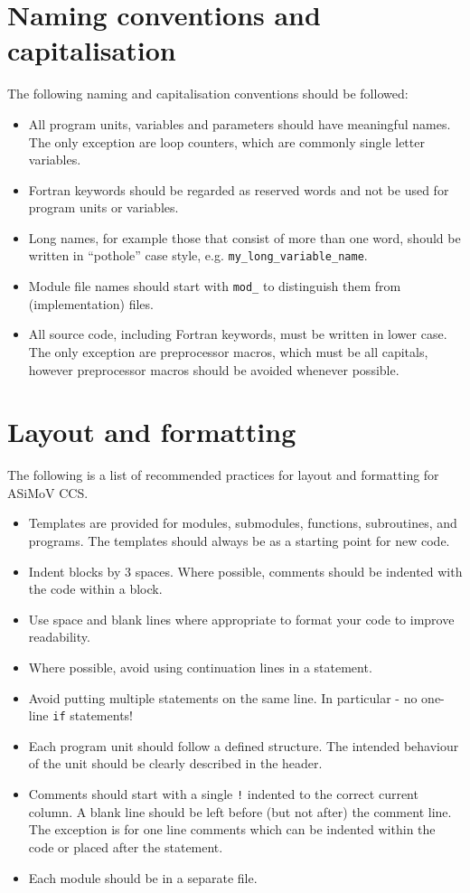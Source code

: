 \documentclass[11pt]{article}
\begin{document}
\section{Naming conventions and capitalisation}
The following naming and capitalisation conventions should be followed:
\begin{itemize}
  \item All program units, variables and parameters should have meaningful names. The only exception are loop counters, which
  are commonly single letter variables.
  \item Fortran keywords should be regarded as reserved words and not be used for program units or variables.
  \item Long names, for example those that consist of more than one word, 
  should be written in ``pothole'' case style, e.g. \texttt{my\_long\_variable\_name}.
  \item Module file names should start with \texttt{mod\_} to distinguish them from (implementation) files.
  \item All source code, including Fortran keywords, must be written in lower case. The only exception are preprocessor 
  macros, which must be all capitals, however preprocessor macros should be avoided whenever possible.
\end{itemize}

\section{Layout and formatting}
The following is a list of recommended practices for layout and formatting for ASiMoV CCS.

\begin{itemize}
\item Templates are provided for modules, submodules, functions, subroutines, and programs. The templates should always be as a 
starting point for new code.
\item Indent blocks by 3 spaces. Where possible, comments should be indented with the code within a block.
\item Use space and blank lines where appropriate to format your code to improve readability.
\item Where possible, avoid using continuation lines in a statement.
\item Avoid putting multiple statements on the same line. In particular - no one-line \texttt{if}
  statements!
\item Each program unit should follow a defined structure. The intended behaviour of the unit should be clearly described in the header.
\item Comments should start with a single \texttt{!} indented to the correct current column. A blank line should be left before (but not after) the 
comment line. The exception is for one line comments which can be indented within the code or placed after the statement.
\item Each module should be in a separate file.
\end{itemize}
\end{document}
